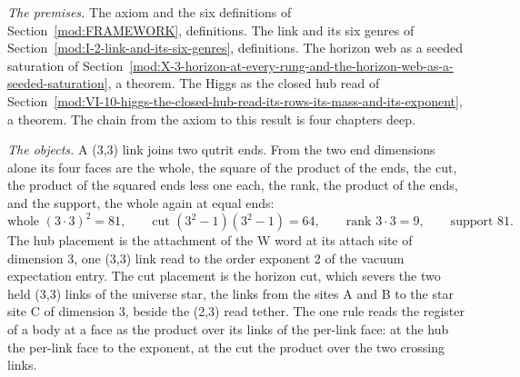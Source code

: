 \begin{chproof}
\textit{The premises.} The axiom and the six definitions of Section~\ref{mod:FRAMEWORK}, definitions. The link and its six genres of Section~\ref{mod:I-2-link-and-its-six-genres}, definitions. The horizon web as a seeded saturation of Section~\ref{mod:X-3-horizon-at-every-rung-and-the-horizon-web-as-a-seeded-saturation}, a theorem. The Higgs as the closed hub read of Section~\ref{mod:VI-10-higgs-the-closed-hub-read-its-rows-its-mass-and-its-exponent}, a theorem. The chain from the axiom to this result is four chapters deep.

\textit{The objects.} A (3,3) link joins two qutrit ends. From the two end dimensions alone its four faces are the whole, the square of the product of the ends, the cut, the product of the squared ends less one each, the rank, the product of the ends, and the support, the whole again at equal ends:
\begin{equation}
\text{whole } (3\cdot 3)^2 = 81,\qquad \text{cut } (3^2-1)(3^2-1) = 64,\qquad \text{rank } 3\cdot 3 = 9,\qquad \text{support } 81.
\end{equation}
The hub placement is the attachment of the W word at its attach site of dimension 3, one (3,3) link read to the order exponent 2 of the vacuum expectation entry. The cut placement is the horizon cut, which severs the two held (3,3) links of the universe star, the links from the sites A and B to the star site C of dimension 3, beside the (2,3) read tether. The one rule reads the register of a body at a face as the product over its links of the per-link face: at the hub the per-link face to the exponent, at the cut the product over the two crossing links.


\end{chproof}
